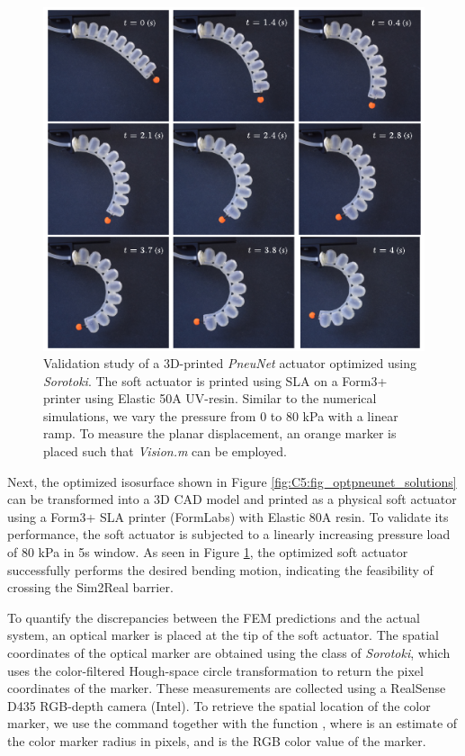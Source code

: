 \begin{figure}[!t]
    \centering
    \includegraphics*[width=.825\textwidth]{./pdf/thesis-figure-6-24.pdf}
    \caption{Validation study of a 3D-printed \textit{PneuNet} actuator optimized using \textit{Sorotoki}. The soft actuator is printed using SLA on a Form3+ printer using Elastic 50A UV-resin. Similar to the numerical simulations, we vary the pressure from 0 to 80 \si{\kilo \pascal} with a linear ramp. To measure the planar displacement, an orange marker is placed such that \textit{Vision.m} can be employed.}
    \label{fig:C5:fig_optpneunet_exp}
\end{figure}

Next, the optimized isosurface shown in Figure \ref{fig:C5:fig_optpneunet_solutions} can be transformed into a 3D CAD model and printed as a physical soft actuator using a Form3+ SLA printer (FormLabs) with Elastic 80A resin. To validate its performance, the soft actuator is subjected to a linearly increasing pressure load of 80 \si{\kilo \pascal} in 5\si{\second} window. As seen in Figure \ref{fig:C5:fig_optpneunet_exp}, the optimized soft actuator successfully performs the desired bending motion, indicating the feasibility of crossing the Sim2Real barrier.

To quantify the discrepancies between the FEM predictions and the actual system, an optical marker is placed at the tip of the soft actuator. The spatial coordinates of the optical marker are obtained using the  class of \textit{Sorotoki}, which uses the color-filtered Hough-space circle transformation to return the pixel coordinates of the marker. These measurements are collected using a RealSense D435 RGB-depth camera (Intel). To retrieve the spatial location of the color marker, we use the command  together with the function , where  is an estimate of the color marker radius in pixels, and  is the RGB color value of the marker.

